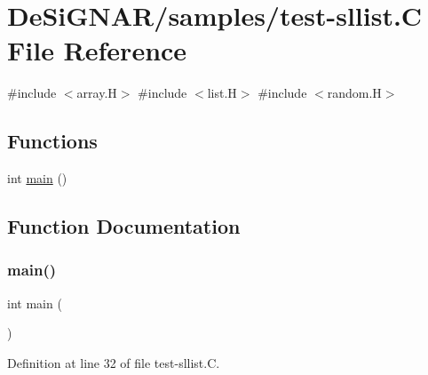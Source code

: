 \hypertarget{test-sllist_8_c}{}\section{De\+Si\+G\+N\+A\+R/samples/test-\/sllist.C File Reference}
\label{test-sllist_8_c}
{\ttfamily \#include $<$array.\+H$>$}\newline
{\ttfamily \#include $<$list.\+H$>$}\newline
{\ttfamily \#include $<$random.\+H$>$}\newline
\subsection*{Functions}
\begin{DoxyCompactItemize}
\item 
int \hyperlink{test-sllist_8_c_ae66f6b31b5ad750f1fe042a706a4e3d4}{main} ()
\end{DoxyCompactItemize}


\subsection{Function Documentation}
\mbox{\label{test-sllist_8_c_ae66f6b31b5ad750f1fe042a706a4e3d4}} 
\subsubsection{\texorpdfstring{main()}{main()}}
{\footnotesize\ttfamily int main (\begin{DoxyParamCaption}{ }\end{DoxyParamCaption})}



Definition at line 32 of file test-\/sllist.\+C.

